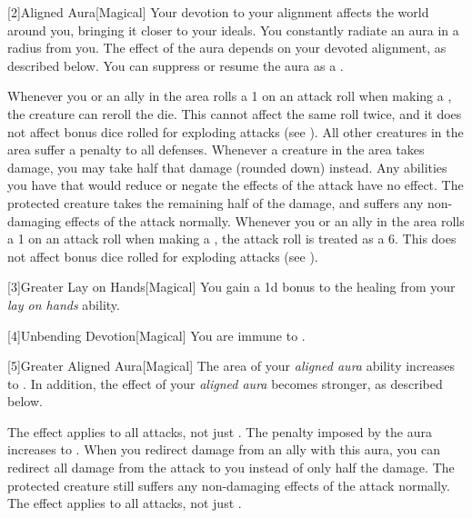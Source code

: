         [2]{Aligned Aura}[Magical]
        Your devotion to your alignment affects the world around you, bringing it closer to your ideals.
        You constantly radiate an aura in a \areamed radius  from you.
        The effect of the aura depends on your devoted alignment, as described below.
        You can suppress or resume the aura as a .

         Whenever you or an ally in the area rolls a 1 on an attack roll when making a , the creature can reroll the die.
        This cannot affect the same roll twice, and it does not affect bonus dice rolled for exploding attacks (see ).
         All other creatures in the area suffer a  penalty to all defenses.
         Whenever a creature in the area takes damage, you may take half that damage (rounded down) instead.
        Any abilities you have that would reduce or negate the effects of the attack have no effect.
        The protected creature takes the remaining half of the damage, and suffers any non-damaging effects of the attack normally.
         Whenever you or an ally in the area rolls a 1 on an attack roll when making a , the attack roll is treated as a 6.
        This does not affect bonus dice rolled for exploding attacks (see ).

        [3]{Greater Lay on Hands}[Magical]
        You gain a \plus1d bonus to the healing from your \textit{lay on hands} ability.

        [4]{Unbending Devotion}[Magical]
        You are immune to  .

        [5]{Greater Aligned Aura}[Magical]
        The area of your \textit{aligned aura} ability increases to \arealarge.
        In addition, the effect of your \textit{aligned aura} becomes stronger, as described below.

         The effect applies to all attacks, not just .
         The penalty imposed by the aura increases to .
         When you redirect damage from an ally with this aura, you can redirect all damage from the attack to you instead of only half the damage.
        The protected creature still suffers any non-damaging effects of the attack normally.
         The effect applies to all attacks, not just .

